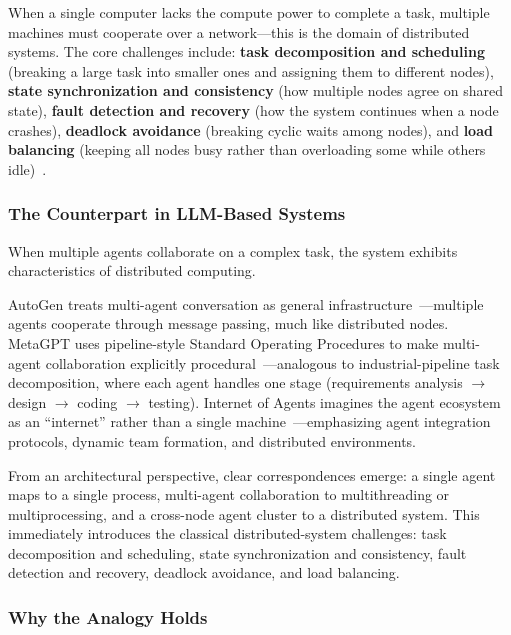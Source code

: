 \documentclass[11pt,a4paper]{article}
\begin{document}
When a single computer lacks the compute power to complete a task, multiple machines must cooperate over a network---this is the domain of distributed systems.
The core challenges include:
\textbf{task decomposition and scheduling} (breaking a large task into smaller ones and assigning them to different nodes),
\textbf{state synchronization and consistency} (how multiple nodes agree on shared state),
\textbf{fault detection and recovery} (how the system continues when a node crashes),
\textbf{deadlock avoidance} (breaking cyclic waits among nodes), and
\textbf{load balancing} (keeping all nodes busy rather than overloading some while others idle)~\cite{hennessy2017quantitative}.

\subsubsection{The Counterpart in LLM-Based Systems}

When multiple agents collaborate on a complex task, the system exhibits characteristics of distributed computing.

AutoGen treats multi-agent conversation as general infrastructure~\cite{wu2023autogen}---multiple agents cooperate through message passing, much like distributed nodes.
MetaGPT uses pipeline-style Standard Operating Procedures to make multi-agent collaboration explicitly procedural~\cite{metagpt2023}---analogous to industrial-pipeline task decomposition, where each agent handles one stage (requirements analysis $\to$ design $\to$ coding $\to$ testing).
Internet of Agents imagines the agent ecosystem as an ``internet'' rather than a single machine~\cite{ioa2024}---emphasizing agent integration protocols, dynamic team formation, and distributed environments.

From an architectural perspective, clear correspondences emerge:
a single agent maps to a single process, multi-agent collaboration to multithreading or multiprocessing, and a cross-node agent cluster to a distributed system.
This immediately introduces the classical distributed-system challenges: task decomposition and scheduling, state synchronization and consistency, fault detection and recovery, deadlock avoidance, and load balancing.

\subsubsection{Why the Analogy Holds}
\end{document}
